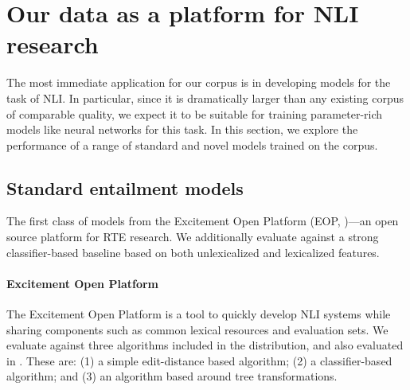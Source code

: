 \section{Our data as a platform for NLI research}

The most immediate application for our corpus is in developing models for the task of NLI. In particular, since it is dramatically larger than any existing corpus of comparable quality, we expect it to be suitable for training  parameter-rich models like neural networks for this task. In this section, we explore the performance of a range of standard and novel models trained on the corpus.

\subsection{Standard entailment models}

The first class of models from the Excitement Open
  Platform (EOP,
  \citealt{pado2014design,magnini2014excitement})---an open source platform for RTE research.
We additionally evaluate against a strong classifier-based baseline based on
  both unlexicalized and lexicalized features.

%
%
\paragraph{Excitement Open Platform}
The Excitement Open Platform is a tool to quickly develop NLI systems
  while sharing components such as common lexical resources and 
  evaluation sets.
We evaluate against three algorithms included in the distribution,
  and also evaluated in .
These are: 
  (1) a simple edit-distance based algorithm;
  (2) a classifier-based algorithm; and
  (3) an algorithm based around tree transformations.

